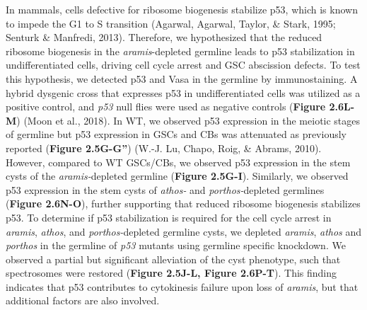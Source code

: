 \documentclass[12pt,oneside]{reedthesis}
\begin{document}
\setlength\parindent{24pt}

\textbf{\hfill\break
}

In mammals, cells defective for ribosome biogenesis stabilize p53, which is known to impede the G1 to S transition (Agarwal, Agarwal, Taylor, \& Stark, 1995; Senturk \& Manfredi, 2013). Therefore, we hypothesized that the reduced ribosome biogenesis in the \emph{aramis}-depleted germline leads to p53 stabilization in undifferentiated cells, driving cell cycle arrest and GSC abscission defects. To test this hypothesis, we detected p53 and Vasa in the germline by immunostaining. A hybrid dysgenic cross that expresses p53 in undifferentiated cells was utilized as a positive control, and \emph{p53} null flies were used as negative controls (\textbf{Figure 2.6L-M}) (Moon et al., 2018). In WT, we observed p53 expression in the meiotic stages of germline but p53 expression in GSCs and CBs was attenuated as previously reported (\textbf{Figure 2.5G-G''}) (W.-J. Lu, Chapo, Roig, \& Abrams, 2010). However, compared to WT GSCs/CBs, we observed p53 expression in the stem cysts of the \emph{aramis-}depleted germline (\textbf{Figure 2.5G-I}). Similarly, we observed p53 expression in the stem cysts of \emph{athos-} and \emph{porthos-}depleted germlines (\textbf{Figure 2.6N-O}), further supporting that reduced ribosome biogenesis stabilizes p53. To determine if p53 stabilization is required for the cell cycle arrest in \emph{aramis}, \emph{athos}, and \emph{porthos-}depleted germline cysts, we depleted \emph{aramis}, \emph{athos} and \emph{porthos} in the germline of \emph{p53} mutants using germline specific knockdown. We observed a partial but significant alleviation of the cyst phenotype, such that spectrosomes were restored (\textbf{Figure 2.5J-L, Figure 2.6P-T}). This finding indicates that p53 contributes to cytokinesis failure upon loss of \emph{aramis}, but that additional factors are also involved.
\end{document}
